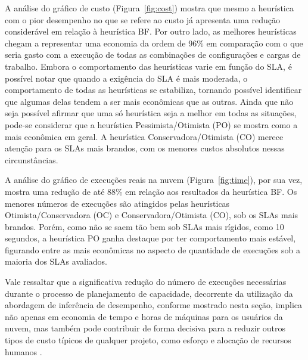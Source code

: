 \documentclass[10pt,conference,compsocconf]{IEEEtran}
\begin{document}
A análise do gráfico de custo (Figura~\ref{fig:cost}) mostra que mesmo a heurística com o pior desempenho no que se refere ao custo já apresenta uma redução considerável 
em relação à heurística BF. Por outro lado, as melhores heurísticas chegam a 
representar uma economia da ordem de 96\% em comparação com o que seria gasto
com a execução de todas as combinações de configurações e cargas de trabalho.
Embora o comportamento das heurísticas varie em função do SLA, é possível notar
que quando a exigência do SLA é mais moderada, o comportamento de todas as heurísticas
se estabiliza, tornando possível identificar que algumas delas tendem a
ser mais econômicas que as outras. Ainda que não seja possível afirmar que uma só 
heurística seja a melhor em todas as situações, pode-se considerar que a heurística
Pessimista/Otimista (PO) se mostra como a mais econômica em geral. A heurística
Conservadora/Otimista (CO) merece atenção para os SLAs mais brandos, com os menores
custos absolutos nessas circunstâncias. 

A análise do gráfico de execuções reais na nuvem (Figura~\ref{fig:time}), por sua vez, mostra uma redução de até 88\% em relação aos resultados da heurística BF. Os menores números de execuções são atingidos pelas heurísticas Otimista/Conservadora (OC) e Conservadora/Otimista (CO), sob os SLAs mais brandos. Porém, como não se saem tão 
bem sob SLAs mais rígidos, como 10 segundos, a heurística PO ganha destaque por ter comportamento mais estável, figurando entre as mais econômicas no aspecto de quantidade de execuções sob a maioria dos SLAs avaliados. 

Vale ressaltar que a significativa redução do número de execuções necessárias durante o processo de planejamento de capacidade, decorrente da utilização da abordagem de inferência de desempenho, conforme mostrado nesta seção, implica não apenas em economia de tempo e horas de máquinas para os usuários da nuvem, mas também pode contribuir de forma decisiva para a reduzir outros tipos de custo típicos de qualquer projeto, como esforço e alocação de recursos humanos .


\end{document}
